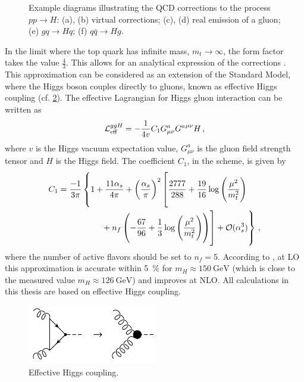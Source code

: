 \begin{figure}
\begin{subfigure}[]{0.3\textwidth}
	\caption{}
\end{subfigure}
\caption{Example diagrams illustrating the QCD corrections to the process $pp \rightarrow H$:
		(a), (b) virtual corrections; (c), (d) real emission of a gluon; (e) $gq \rightarrow Hq$; (f) $q \bar q \rightarrow Hg$.}
\label{fig:ggh_corrections}
\end{figure}
%

In the limit where the top quark has infinite mass, $m_t \rightarrow \infty$, the form factor takes the value $\frac{4}{3}$.
This allows for an analytical expression of the corrections \cite{gfusionnlo2}.
This approximation can be considered as an extension of the Standard Model, where the Higgs boson couples directly to gluons, known as effective Higgs coupling (cf. \cref{fig:heft}).
The effective Lagrangian for Higgs gluon interaction can be written as \cite{gfusionnnlo2}
%
\begin{equation}
	\operatorname{\mathcal{L}}_\text{eff}^{ggH} = - \frac{1}{4v} C_1 G_{\mu \nu}^a {G^a}^{\mu \nu} H \, ,
\end{equation}
%
where $v$ is the Higgs vacuum expectation value, $G^a_{\mu \nu}$ is the gluon field strength tensor and $H$ is the Higgs field.
The coefficient $C_1$, in the \msbar{} scheme, is given by
%
\begin{align}
	C_1 = \frac{-1}{3 \pi} &\left\{1 + \frac{11 \alpha_s}{4 \pi} + \left( \frac{\alpha_s}{\pi} \right)^2 \left[ \frac{2777}{288} + \frac{19}{16} \log\left( \frac{\mu^2}{m_t^2} \right)
	\vphantom{n_f \left( -\frac{67}{96} + \frac{1}{3} \log\left( \frac{\mu^2}{m_t^2} \right) \right)} \right. \right. \nonumber \\
		&\qquad \left. \left. \vphantom{\frac{2777}{288} + \frac{19}{16} \log\left( \frac{\mu^2}{m_t^2} \right)}
		+ n_f \left( -\frac{67}{96} + \frac{1}{3} \log\left( \frac{\mu^2}{m_t^2} \right) \right) \right] + \order{\alpha_s^3} \right\} \, ,
\end{align}
%
where the number of active flavors should be set to $n_f = 5$.
According to \cite{gfusionnnlo2}, at LO this approximation is accurate within \SI{5}{\percent} for $m_H \approx \SI{150}{\giga\electronvolt}$ (which is close to the measured value $m_H \approx \SI{126}{\giga\electronvolt}$) and improves at NLO.
All calculations in this thesis are based on effective Higgs coupling.
%
\begin{figure}[]
	\includegraphics[width=0.5\textwidth]{images/heft.pdf}
	\caption{Effective Higgs coupling.}
	\label{fig:heft}
\end{figure}
%

